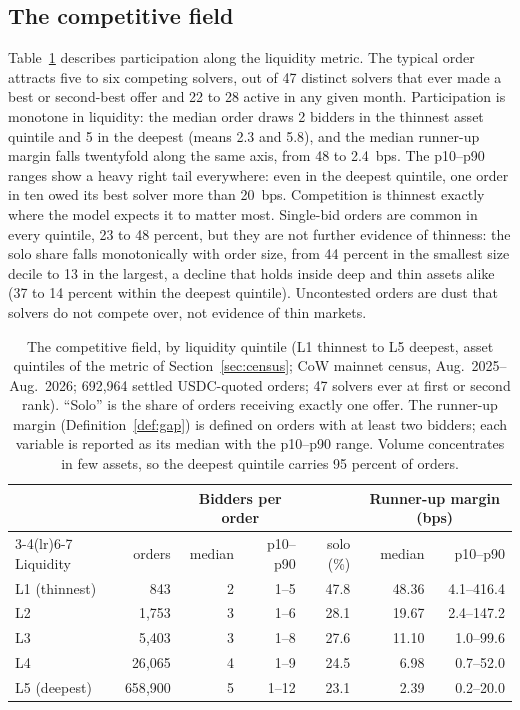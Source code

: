 \documentclass[11pt]{article}
\theoremstyle{plain}
\theoremstyle{definition}
\theoremstyle{remark}
\begin{document}
\subsection{The competitive field}\label{sec:field}
Table~\ref{tab:field} describes participation along the liquidity metric. The typical order attracts five to six competing solvers, out of 47 distinct solvers that ever made a best or second-best offer and 22 to 28 active in any given month. Participation is monotone in liquidity: the median order draws 2 bidders in the thinnest asset quintile and 5 in the deepest (means 2.3 and 5.8), and the median runner-up margin falls twentyfold along the same axis, from 48 to 2.4~bps. The p10--p90 ranges show a heavy right tail everywhere: even in the deepest quintile, one order in ten owed its best solver more than 20~bps. Competition is thinnest exactly where the model expects it to matter most. Single-bid orders are common in every quintile, 23 to 48 percent, but they are not further evidence of thinness: the solo share falls monotonically with order size, from 44 percent in the smallest size decile to 13 in the largest, a decline that holds inside deep and thin assets alike (37 to 14 percent within the deepest quintile). Uncontested orders are dust that solvers do not compete over, not evidence of thin markets.


\begin{table}[t]
\centering
{\fontsize{10}{12}\selectfont
\begin{tabular}{lrrrrrr}
\toprule
 & & \multicolumn{2}{c}{Bidders per order} & & \multicolumn{2}{c}{Runner-up margin (bps)} \\
\cmidrule(lr){3-4}\cmidrule(lr){6-7}
Liquidity & orders & median & p10--p90 & solo (\%) & median & p10--p90 \\
\midrule
L1 (thinnest) & 843     & 2 & 1--5  & 47.8 & 48.36 & 4.1--416.4 \\
L2            & 1{,}753  & 3 & 1--6  & 28.1 & 19.67 & 2.4--147.2 \\
L3            & 5{,}403  & 3 & 1--8  & 27.6 & 11.10 & 1.0--99.6 \\
L4            & 26{,}065 & 4 & 1--9  & 24.5 & 6.98  & 0.7--52.0 \\
L5 (deepest)  & 658{,}900 & 5 & 1--12 & 23.1 & 2.39  & 0.2--20.0 \\
\bottomrule
\end{tabular}}
\caption{The competitive field, by liquidity quintile (L1 thinnest to L5 deepest, asset quintiles of the metric of Section~\ref{sec:census}; CoW mainnet census, Aug.~2025--Aug.~2026; 692{,}964 settled USDC-quoted orders; 47 solvers ever at first or second rank). ``Solo'' is the share of orders receiving exactly one offer. The runner-up margin (Definition~\ref{def:gap}) is defined on orders with at least two bidders; each variable is reported as its median with the p10--p90 range. Volume concentrates in few assets, so the deepest quintile carries 95 percent of orders.}
\label{tab:field}
\end{table}
\end{document}
